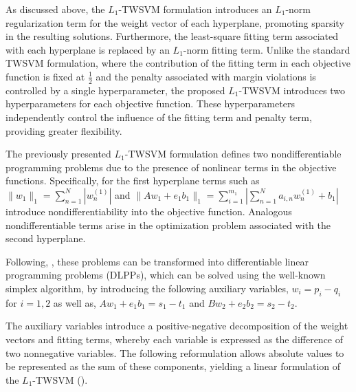 \documentclass[12pt]{report} %
\begin{document}
As discussed above, the $L_1$-TWSVM formulation introduces an $L_1$-norm regularization term for the weight vector of each hyperplane, promoting sparsity in the resulting solutions. Furthermore, the least-square fitting term associated with each hyperplane is replaced by an $L_1$-norm fitting term. Unlike the standard TWSVM formulation, where the contribution of the fitting term in each objective function is fixed at $\frac{1}{2}$ and the penalty associated with margin violations is controlled by a single hyperparameter, the proposed $L_1$-TWSVM introduces two hyperparameters for each objective function. These hyperparameters independently control the influence of the fitting term and penalty term, providing greater flexibility.

The previously presented $L_1$-TWSVM formulation defines two nondifferentiable programming problems due to the presence of nonlinear terms in the objective functions. Specifically, for the first hyperplane terms such as $\|w_1\|_1 = \sum_{n=1}^N|w_n^{(1)}|$ and $\|Aw_1+e_1b_1\|_1 = \sum_{i=1}^{m_1}|\sum_{n=1}^Na_{i,n}w_n^{(1)} + b_1|$ introduce nondifferentiability into the objective function. Analogous nondifferentiable terms arise in the optimization problem associated with the second hyperplane.

Following, \cite{bai2014novel}, these problems can be transformed into differentiable linear programming problems (DLPPs), which can be solved using the well-known simplex algorithm, by introducing the following auxiliary variables, $w_i = p_i - q_i$ for $i = 1,2$ as well as, $Aw_1 + e_1b_1 = s_1 - t_1$ and $Bw_2 + e_2b_2 = s_2 - t_2$.

\newpage

The auxiliary variables introduce a positive-negative decomposition of the weight vectors and fitting terms, whereby each variable is expressed as the difference of two nonnegative variables. The following reformulation allows absolute values to be represented as the sum of these components, yielding a linear formulation of the $L_1$-TWSVM (\cite{bai2014novel}).
\end{document}
